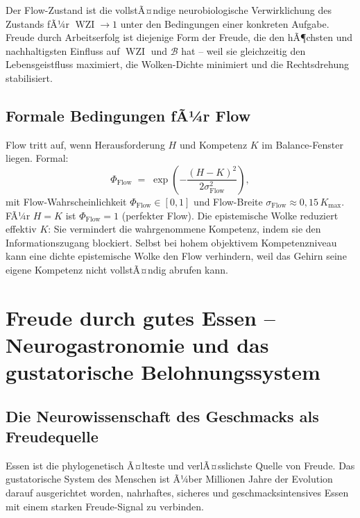 ﻿\documentclass[12pt,a4paper]{report}
\theoremstyle{plain}
\theoremstyle{definition}
\theoremstyle{remark}
\DeclareMathOperator{\WZI}{WZI}
\begin{document}
		Der Flow-Zustand ist die vollstÃ¤ndige neurobiologische Verwirklichung
		des Zustands fÃ¼r $\WZI \to 1$ unter den Bedingungen einer konkreten
		Aufgabe. Freude durch Arbeitserfolg ist diejenige Form der Freude,
		die den hÃ¶chsten und nachhaltigsten Einfluss auf $\WZI$ und $\mathcal{B}$
		hat -- weil sie gleichzeitig den Lebensgeistfluss maximiert,
		die Wolken-Dichte minimiert und die Rechtsdrehung stabilisiert.


	\subsection{Formale Bedingungen fÃ¼r Flow}

	Flow tritt auf, wenn Herausforderung $H$ und Kompetenz $K$
	im Balance-Fenster liegen. Formal:
	\[
	\Phi_{\mathrm{Flow}} \;=\;
	\exp\!\left(-\frac{(H - K)^2}{2\sigma_{\mathrm{Flow}}^2}\right),
	\]
	mit Flow-Wahrscheinlichkeit $\Phi_{\mathrm{Flow}} \in [0,1]$
	und Flow-Breite $\sigma_{\mathrm{Flow}} \approx 0{,}15\,K_{\max}$.
	FÃ¼r $H = K$ ist $\Phi_{\mathrm{Flow}} = 1$ (perfekter Flow).
	Die epistemische Wolke reduziert effektiv $K$: Sie vermindert die
	wahrgenommene Kompetenz, indem sie den Informationszugang blockiert.
	Selbst bei hohem objektivem Kompetenzniveau kann eine dichte
	epistemische Wolke den Flow verhindern, weil das Gehirn seine
	eigene Kompetenz nicht vollstÃ¤ndig abrufen kann.

	\section{Freude durch gutes Essen -- Neurogastronomie und das gustatorische Belohnungssystem}

	\subsection{Die Neurowissenschaft des Geschmacks als Freudequelle}

	Essen ist die phylogenetisch Ã¤lteste und verlÃ¤sslichste Quelle
	von Freude. Das gustatorische System des Menschen ist Ã¼ber
	Millionen Jahre der Evolution darauf ausgerichtet worden,
	nahrhaftes, sicheres und geschmacksintensives Essen mit einem
	starken Freude-Signal zu verbinden.
\end{document}
